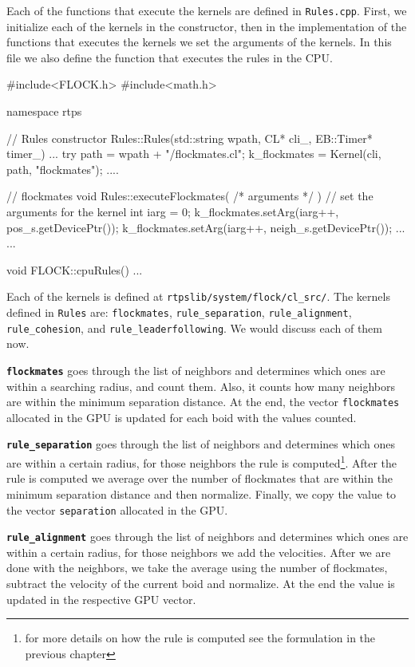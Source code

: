 Each of the functions that execute the kernels are defined in \texttt{Rules.cpp}. First, we initialize each of the kernels in the constructor, then in the implementation of the functions that executes the kernels we set the arguments of the kernels. In this file we also define the function that executes the rules in the CPU.

\begin{cppcode}{0}
#include<FLOCK.h>
#include<math.h>

namespace rtps
{
	// Rules constructor
	Rules::Rules(std::string wpath, CL* cli_, EB::Timer* timer_)
	{
		...
		try
		{
			path = wpath + "/flockmates.cl";
			k_flockmates = Kernel(cli, path, "flockmates");
		}
		....
	}

	// flockmates
	void Rules::executeFlockmates( /* arguments */ )
	{
		// set the arguments for the kernel
		int iarg = 0;
		k_flockmates.setArg(iarg++, pos_s.getDevicePtr());
		k_flockmates.setArg(iarg++, neigh_s.getDevicePtr());
		...
	}
	...
	
	void FLOCK::cpuRules()
	{
		...
	}
}
\end{cppcode}

Each of the kernels is defined at \texttt{rtpslib/system/flock/cl\_src/}. The kernels defined in \texttt{Rules} are: \texttt{flockmates}, \texttt{rule\_separation}, \texttt{rule\_alignment}, \texttt{rule\_cohesion}, and \texttt{rule\_leaderfollowing}. We would discuss each of them now.

\texttt{\textbf{flockmates}} goes through the list of neighbors and determines which ones are within a searching radius, and count them. Also, it counts how many neighbors are within the minimum separation distance. At the end, the vector \texttt{flockmates} allocated in the GPU is updated for each boid with the values counted.

\texttt{\textbf{rule\_separation}} goes through the list of neighbors and determines which ones are within a certain radius, for those neighbors the rule is computed\footnote{for more details on how the rule is computed see the formulation in the previous chapter}. After the rule is computed we average over the number of flockmates that are within the minimum separation distance and then normalize. Finally, we copy the value to the vector \texttt{separation} allocated in the GPU.

\texttt{\textbf{rule\_alignment}} goes through the list of neighbors and determines which ones are within a certain radius, for those neighbors we add the velocities. After we are done with the neighbors, we take the average using the number of flockmates, subtract the velocity of the current boid and normalize. At the end the value is updated in the respective GPU vector. 

